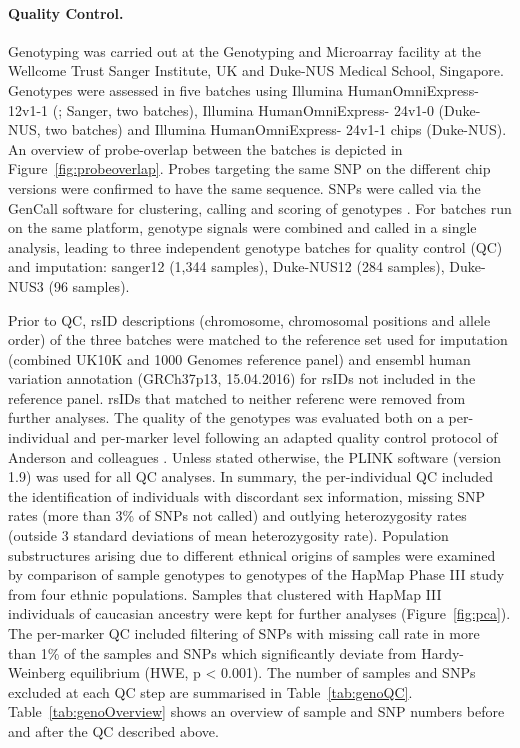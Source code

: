 \paragraph{Quality Control.} Genotyping was carried out at the Genotyping and Microarray facility at the Wellcome Trust Sanger Institute, UK  and Duke-NUS Medical School, Singapore. Genotypes were assessed in five batches using Illumina HumanOmniExpress- 12v1-1 (; Sanger, two batches), Illumina HumanOmniExpress- 24v1-0 (Duke-NUS, two batches) and Illumina HumanOmniExpress- 24v1-1 chips (Duke-NUS). An overview of probe-overlap between the batches is depicted in Figure~\ref{fig:probeoverlap}. Probes targeting the same SNP on the different chip versions were confirmed to have the same sequence. SNPs were called via the GenCall software for clustering, calling and scoring of genotypes \citep{Teo2007}. For batches run on the same platform, genotype signals were combined and called in a single analysis, leading to three independent genotype batches for quality control (QC) and imputation: sanger12 (1,344 samples), Duke-NUS12 (284 samples), Duke-NUS3 (96 samples).

Prior to QC, rsID descriptions (chromosome, chromosomal positions and allele order) of the three batches were matched to the reference set used for imputation (combined UK10K and 1000 Genomes reference panel) and ensembl human variation annotation (GRCh37p13, 15.04.2016) for rsIDs not included in the reference panel. rsIDs that matched to neither referenc were removed from further analyses. The quality of the genotypes was evaluated both on a per-individual and per-marker level following an adapted quality control protocol of Anderson and colleagues \citep{Anderson2010}. Unless stated otherwise, the PLINK software (version 1.9) \citep{Purcell2007, Chang2015} was used for all QC analyses. In summary, the per-individual QC included the identification of individuals with discordant sex information, missing SNP rates (more than 3\% of SNPs not called) and outlying heterozygosity rates (outside 3 standard deviations of mean heterozygosity rate). Population substructures arising due to different ethnical origins of samples were examined by comparison of sample genotypes to genotypes of the HapMap Phase III study \citep{HapMap2005} from four ethnic populations. Samples that clustered with HapMap III individuals of caucasian ancestry were kept for further analyses (Figure~\ref{fig:pca}). The per-marker QC included filtering of SNPs with missing call rate in more than 1\% of the samples and SNPs which significantly deviate from Hardy-Weinberg equilibrium (HWE, p < 0.001). The number of samples and SNPs excluded at each QC step are summarised in Table~\ref{tab:genoQC}. Table~\ref{tab:genoOverview} shows an overview of sample and SNP numbers before and after the QC described above. 

